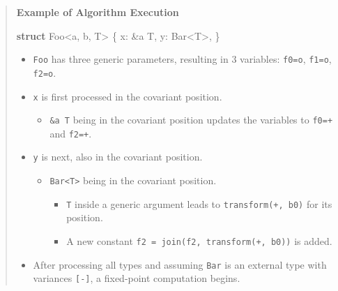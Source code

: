 \documentclass[
  11pt,
  twoside]{report}
\newenvironment{Shaded}{}{}
\newcommand{\KeywordTok}[1]{\textbf{#1}}
\newcommand{\NormalTok}[1]{#1}
\newcommand{\OperatorTok}[1]{#1}
\newcommand{\OtherTok}[1]{#1}
\providecommand{\tightlist}{%
  \setlength{\itemsep}{0pt}\setlength{\parskip}{0pt}}
\begin{document}
\begin{quote}
\textbf{Example of Algorithm Execution}

\begin{Shaded}
\begin{Highlighting}[]
 \KeywordTok{struct}\NormalTok{ Foo}\OperatorTok{\textless{}}\OtherTok{\textquotesingle{}a}\OperatorTok{,} \OtherTok{\textquotesingle{}b}\OperatorTok{,}\NormalTok{ T}\OperatorTok{\textgreater{}} \OperatorTok{\{}
\NormalTok{     x}\OperatorTok{:} \OperatorTok{\&}\OtherTok{\textquotesingle{}a}\NormalTok{ T}\OperatorTok{,}
\NormalTok{     y}\OperatorTok{:}\NormalTok{ Bar}\OperatorTok{\textless{}}\NormalTok{T}\OperatorTok{\textgreater{},}
 \OperatorTok{\}}
\end{Highlighting}
\end{Shaded}

\begin{itemize}
\tightlist
\item
  \texttt{Foo} has three generic parameters, resulting in 3 variables:
  \texttt{f0=o}, \texttt{f1=o}, \texttt{f2=o}.
\item
  \texttt{x} is first processed in the covariant position.

  \begin{itemize}
  \tightlist
  \item
    \texttt{\&\textquotesingle{}a\ T} being in the covariant position
    updates the variables to \texttt{f0=+} and \texttt{f2=+}.
  \end{itemize}
\item
  \texttt{y} is next, also in the covariant position.

  \begin{itemize}
  \tightlist
  \item
    \texttt{Bar\textless{}T\textgreater{}} being in the covariant
    position.

    \begin{itemize}
    \tightlist
    \item
      \texttt{T} inside a generic argument leads to
      \texttt{transform(+,\ b0)} for its position.
    \item
      A new constant \texttt{f2\ =\ join(f2,\ transform(+,\ b0))} is
      added.
    \end{itemize}
  \end{itemize}
\item
  After processing all types and assuming \texttt{Bar} is an external
  type with variances \texttt{{[}-{]}}, a fixed-point computation
  begins.


\end{itemize}
\end{quote}
\end{document}
